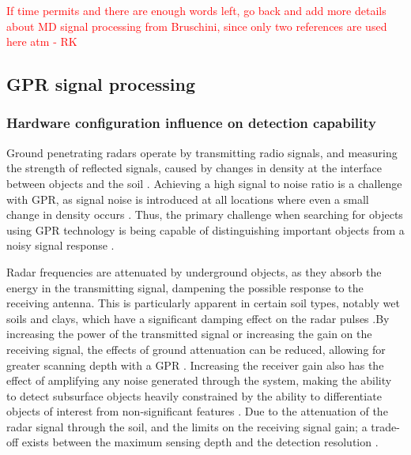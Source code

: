 \documentclass[main.tex]{subfiles}
\begin{document}
\textcolor{red}{If time permits and there are enough words left, go back and add more details about MD signal processing from Bruschini, since only two references are used here atm - RK}

\subsection{GPR signal processing}
\subsubsection{Hardware configuration influence on detection capability}
Ground penetrating radars operate by transmitting radio signals, and measuring the strength of reflected signals, caused by changes in density at the interface between objects and the soil \parencite{sakaguchi2014}. Achieving a high signal to noise ratio is a challenge with GPR, as signal noise is introduced at all locations where even a small change in density occurs \parencite{shresta2003}. Thus, the primary challenge when searching for objects using GPR technology is being capable of distinguishing important objects from a noisy signal response \parencite{sakaguchi2014}.

Radar frequencies are attenuated by underground objects, as they absorb the energy in the transmitting signal, dampening the possible response to the receiving antenna. This is particularly apparent in certain soil types, notably wet soils and clays, which have a significant damping effect on the radar pulses \parencite{sakaguchi2014}.By increasing the power of the transmitted signal or increasing the gain on the receiving signal, the effects of ground attenuation can be reduced, allowing for greater scanning depth with a GPR \parencite{Ho2008}. Increasing the receiver gain also has the effect of amplifying any noise generated through the system, making the ability to detect subsurface objects heavily constrained by the ability to differentiate objects of interest from non-significant features \parencite{shresta2003}. Due to the attenuation of the radar signal through the soil, and the limits on the receiving signal gain; a trade-off exists between the maximum sensing depth and the detection resolution \parencite{Ho2008}.
\end{document}
